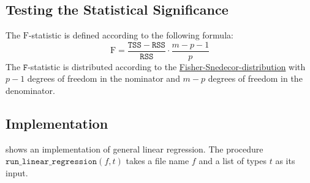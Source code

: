 \subsection{Testing the Statistical Significance}
The $\mathrm{F}$-statistic is defined according to the following formula:
\begin{equation}
  \label{eq:F-statistic}
  \mathrm{F} = \frac{\mathtt{TSS} - \mathtt{RSS}}{\mathtt{RSS}} \cdot \frac{m - p - 1}{p}
\end{equation}
The $\mathtt{F}$-statistic is distributed according to the
\href{https://en.wikipedia.org/wiki/F-distribution}{Fisher-Snedecor-distribution} with $p-1$ degrees of freedom
in the nominator and $m - p$ degrees of freedom in the denominator. 

\subsection{Implementation}
 shows an implementation of general linear regression.
The procedure $\mathtt{run\_linear\_regression}(f, t)$ takes a file name $f$ and a list of types $t$ as its input.

